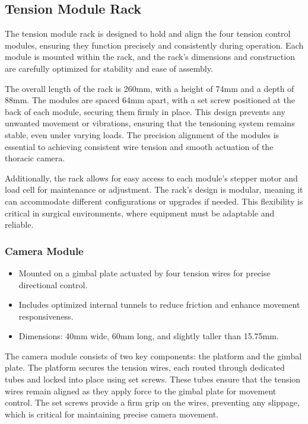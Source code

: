 \subsection{Tension Module Rack}
The tension module rack is designed to hold and align the four tension control modules, ensuring they function precisely and consistently during operation. Each module is mounted within the rack, and the rack's dimensions and construction are carefully optimized for stability and ease of assembly. 

The overall length of the rack is 260mm, with a height of 74mm and a depth of 88mm. The modules are spaced 64mm apart, with a set screw positioned at the back of each module, securing them firmly in place. This design prevents any unwanted movement or vibrations, ensuring that the tensioning system remains stable, even under varying loads. The precision alignment of the modules is essential to achieving consistent wire tension and smooth actuation of the thoracic camera. 

Additionally, the rack allows for easy access to each module's stepper motor and load cell for maintenance or adjustment. The rack's design is modular, meaning it can accommodate different configurations or upgrades if needed. This flexibility is critical in surgical environments, where equipment must be adaptable and reliable. 



\subsubsection{Camera Module}
\begin{itemize}
    \item Mounted on a gimbal plate actuated by four tension wires for precise directional control.
    \item Includes optimized internal tunnels to reduce friction and enhance movement responsiveness.
    \item Dimensions: 40mm wide, 60mm long, and slightly taller than 15.75mm.
\end{itemize}

The camera module consists of two key components: the platform and the gimbal plate. The platform secures the tension wires, each routed through dedicated tubes and locked into place using set screws. These tubes ensure that the tension wires remain aligned as they apply force to the gimbal plate for movement control. The set screws provide a firm grip on the wires, preventing any slippage, which is critical for maintaining precise camera movement. 

